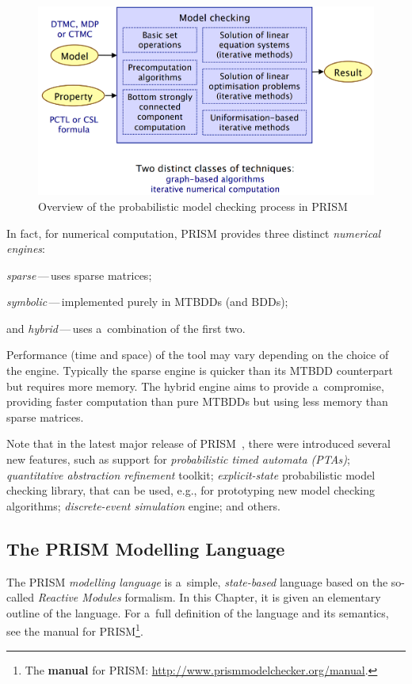 \documentclass[a4paper, 11pt]{article}
\theoremstyle{definition}
\begin{document}
\begin{figure}[hbt]
    \centering
    \includegraphics[width=.6 \linewidth]{prism-model-checking.png}
    \caption{%
        Overview of the probabilistic model checking process in
        PRISM~\cite{probModelCheckLec}%
       }
    \label{fig:prismModelChecking}
\end{figure}

In fact, for numerical computation, PRISM provides three
distinct \emph{numerical engines}:
\begin{enumerate*}[label={(\roman*)}]
    \item
        \emph{sparse}\,---\,uses sparse matrices;

    \item
        \emph{symbolic}\,---\,implemented purely in MTBDDs (and BDDs);

    \item
        and \emph{hybrid}\,---\,uses a~combination of the first two.
\end{enumerate*}
Performance (time and space) of the tool may vary depending on the choice
of the engine. Typically the sparse engine is quicker than its MTBDD
counterpart but requires more memory. The hybrid engine aims to provide
a~compromise, providing faster computation than pure MTBDDs but using less
memory than sparse matrices.

Note that in the latest major release of PRISM~\cite{prism40}, there were
introduced several new features, such as support for \emph{probabilistic
timed automata (PTAs)}; \emph{quantitative abstraction refinement} toolkit;
\emph{explicit-state} probabilistic model checking library, that can be
used, e.g., for prototyping new model checking algorithms;
\emph{discrete-event simulation} engine; and others.

\subsection{The PRISM Modelling Language}
\label{sec:prisimLang}

The PRISM \emph{modelling language} is a~simple, \emph{state-based}
language based on the so-called \emph{Reactive Modules} formalism. In
this Chapter, it is given an elementary outline of the language. For
a~full definition of the language and its semantics, see the manual
for PRISM\footnote{The \textbf{manual} for PRISM:
\url{http://www.prismmodelchecker.org/manual}.}.
\end{document}
